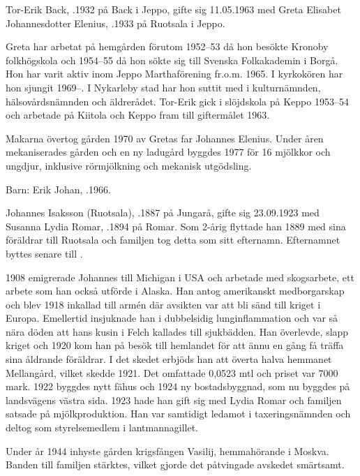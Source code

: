 %
Tor-Erik Back, .1932 på Back i Jeppo, gifte sig 11.05.1963 med Greta Elisabet Johannesdotter Elenius, .1933 på Ruotsala i Jeppo.

Greta har arbetat på hemgården förutom 1952--53 då hon besökte Kronoby folkhögskola och 1954--55 då hon sökte sig till  Svenska Folkakademin i Borgå. Hon har varit aktiv  inom Jeppo Marthaförening fr.o.m. 1965. I kyrkokören har hon sjungit 1969--. I Nykarleby stad har hon suttit med i kulturnämnden, hälsovårdsnämnden och äldrerådet. Tor-Erik gick i slöjdskola på Keppo 1953--54 och arbetade på Kiitola och Keppo fram till giftermålet 1963.

Makarna övertog gården 1970 av Gretas far Johannes Elenius. Under åren mekaniserades gården och en ny ladugård byggdes 1977 för 16 mjölkkor och ungdjur, inklusive rörmjölkning och mekanisk utgödsling.

Barn:  Erik Johan, .1966.


%
Johannes Isaksson (Ruotsala), .1887 på Jungarå, gifte sig 23.09.1923 med Susanna Lydia Romar, .1894 på Romar. Som 2-årig flyttade han 1889 med sina föräldrar till Ruotsala och familjen tog detta som sitt efternamn. Efternamnet byttes senare till .

1908 emigrerade Johannes till Michigan i USA och arbetade med skogsarbete, ett arbete som han också utförde i Alaska. Han antog amerikanskt medborgarskap och blev 1918 inkallad till armén där avsikten var att bli sänd till kriget i Europa. Emellertid insjuknade han i dubbelsidig lunginflammation och var så nära döden att hans kusin i Felch kallades till sjukbädden. Han överlevde, slapp kriget och 1920 kom han på besök till hemlandet för att ännu en gång få träffa sina åldrande föräldrar. I det skedet erbjöds han att överta halva hemmanet Mellangård, vilket skedde 1921. Det omfattade 0,0523 mtl och priset var 7000 mark. 1922 byggdes nytt fähus och 1924 ny bostadsbyggnad, som nu byggdes på landsvägens västra sida. 1923 hade han gift sig med Lydia Romar och familjen satsade på mjölkproduktion. Han var samtidigt ledamot i taxeringsnämnden och deltog som styrelsemedlem i lantmannagillet.

Under år 1944 inhyste gården krigsfången Vasilij, hemmahörande i Moskva. Banden till familjen stärktes, vilket gjorde det påtvingade avskedet smärtsamt.

